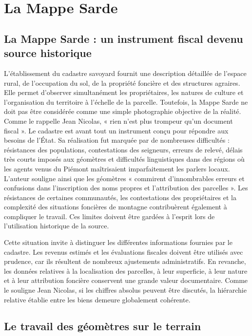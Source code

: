 \documentclass[12pt,a4paper]{report}
\begin{document}
\section {La Mappe Sarde}


\subsection{La Mappe Sarde : un instrument fiscal devenu source historique}



L'établissement du cadastre savoyard fournit une description détaillée de l'espace rural, de l'occupation du sol, de la propriété foncière et des structures agraires. Elle permet d'observer simultanément  les propriétaires, les natures de culture et l'organisation du territoire à l'échelle de la parcelle.
Toutefois, la Mappe Sarde ne doit pas être considérée comme une simple photographie objective de la réalité. Comme le rappelle Jean Nicolas, « rien n'est plus trompeur qu'un document fiscal ». Le cadastre est avant tout un instrument conçu pour répondre aux besoins de l'État. Sa réalisation fut marquée par de nombreuses difficultés : résistances des populations, contestations des seigneurs, erreurs de relevé, délais très courts imposés aux géomètres et difficultés linguistiques dans des régions où les agents venus du Piémont maîtrisaient imparfaitement les parlers locaux. L'auteur souligne ainsi que les géomètres « commirent d'innombrables erreurs et confusions dans l'inscription des noms propres et l'attribution des parcelles ». Les résistances de certaines communautés, les contestations des propriétaires et la complexité des situations foncières de montagne contribuèrent également à compliquer le travail. Ces limites doivent être gardées à l'esprit lors de l'utilisation historique de la source.

Cette situation invite à distinguer les différentes informations fournies par le cadastre. Les revenus estimés et les évaluations fiscales doivent être utilisés avec prudence, car ils résultent de nombreux ajustements administratifs. En revanche, les données relatives à la localisation des parcelles, à leur superficie, à leur nature et à leur attribution foncière conservent une grande valeur documentaire. Comme le souligne Jean Nicolas, si les chiffres absolus peuvent être discutés, la hiérarchie relative établie entre les biens demeure globalement cohérente.

\subsection{Le travail des géomètres sur le terrain}
\end{document}
